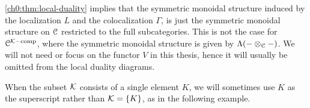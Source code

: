 \begin{remark}
    \label{ch0:rm:monoidal-structure-in-local-duality}
    \cref{ch0:thm:local-duality} implies that the symmetric monoidal structure induced by the localization $L$ and the colocalization $\Gamma$, is just the symmetric monoidal structure on $\EuScript{C}$ restricted to the full subcategories. This is not the case for $\EuScript{C}^{\mathcal{K}-\mathrm{comp}}$, where the symmetric monoidal structure is given by $\Lambda(-\otimes_{\EuScript{C}}-)$. We will not need or focus on the functor $V$ in this thesis, hence it will usually be omitted from the local duality diagrams. 
\end{remark}

\begin{remark}
    When the subset $\mathcal{K}$ consists of a single element $K$, we will sometimes use $K$ as the superscript rather than $\mathcal{K} = \{K\}$, as in the following example.   
\end{remark}

